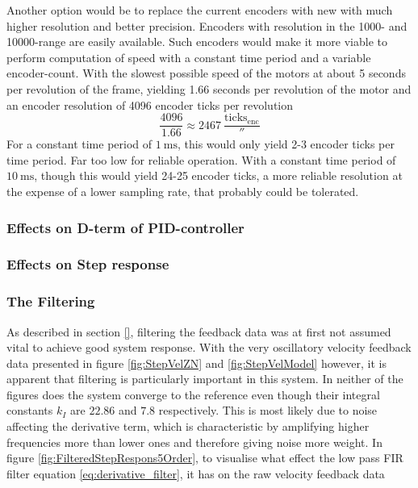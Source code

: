 \documentclass[../../main.tex]{subfiles}
\begin{document}
Another option would be to replace the current encoders with new with much higher resolution and better precision. Encoders with resolution in the 1000- and 10000-range are easily available. Such encoders would make it more viable to perform computation of speed with a constant time period and a variable encoder-count. With the slowest possible speed of the motors at about 5 seconds per revolution of the frame, yielding 1.66 seconds per revolution of the motor and an encoder resolution of 4096 encoder ticks per revolution 
\begin{equation}
    \frac{4096}{1.66} \approx \SI{ 2467 }{ \frac{ \mathrm{ ticks_{enc} } }{ \second } } 
\end{equation}
For a constant time period of $\SI{ 1 }{ \milli \second }$, this would only yield 2-3 encoder ticks per time period. Far too low for reliable operation. With a constant time period of $\SI{ 10 }{ \milli \second }$, though this would yield 24-25 encoder ticks, a more reliable resolution at the expense of a lower sampling rate, that probably could be tolerated.

\subsubsection*{Effects on D-term of PID-controller}

\subsubsection*{Effects on Step response}

\subsubsection*{The Filtering} \label{subsec:TheFiltering}
As described in section \ref{}, filtering the feedback data was at first not assumed vital to achieve good system response. With the very oscillatory velocity feedback data presented in figure \ref{fig:StepVelZN} and \ref{fig:StepVelModel} however, it is apparent that filtering is particularly important in this system. In neither of the figures does the system converge to the reference even though their integral constants $k_I$ are $22.86$ and $7.8$ respectively. This is most likely due to noise affecting the derivative term, which is characteristic by amplifying higher frequencies more than lower ones and therefore giving noise more weight. In figure \ref{fig:FilteredStepRespons5Order}, to visualise what effect the low pass FIR filter equation \ref{eq:derivative_filter}, it has on the raw velocity feedback data
\end{document}
